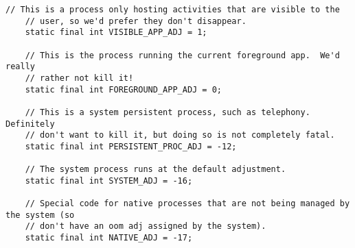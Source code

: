 \begin{lstlisting}[frame=single]
    // This is a process only hosting activities that are visible to the
    // user, so we'd prefer they don't disappear.
    static final int VISIBLE_APP_ADJ = 1;

    // This is the process running the current foreground app.  We'd really
    // rather not kill it!
    static final int FOREGROUND_APP_ADJ = 0;

    // This is a system persistent process, such as telephony.  Definitely
    // don't want to kill it, but doing so is not completely fatal.
    static final int PERSISTENT_PROC_ADJ = -12;

    // The system process runs at the default adjustment.
    static final int SYSTEM_ADJ = -16;

    // Special code for native processes that are not being managed by the system (so
    // don't have an oom adj assigned by the system).
    static final int NATIVE_ADJ = -17;
\end{lstlisting}

